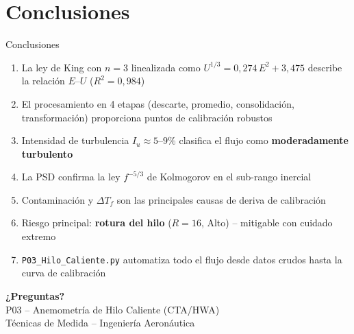 \documentclass[aspectratio=169,12pt]{beamer}
\begin{document}
\section{Conclusiones}

\begin{frame}{Conclusiones}
	\begin{enumerate}
		\item La ley de King con $n=3$ linealizada como
		      $U^{1/3} = 0{,}274\,E^2 + 3{,}475$ describe la
		      relación $E$--$U$ ($R^2 = 0{,}984$)
		\item El procesamiento en 4 etapas (descarte, promedio,
		      consolidación, transformación) proporciona puntos de
		      calibración robustos
		\item Intensidad de turbulencia $I_u \approx 5$--$9\%$
		      clasifica el flujo como \textbf{moderadamente turbulento}
		\item La PSD confirma la ley $f^{-5/3}$ de Kolmogorov en
		      el sub-rango inercial
		\item Contaminación y $\Delta T_f$ son las principales
		      causas de deriva de calibración
		\item Riesgo principal: \textbf{rotura del hilo}
		      ($R = 16$, Alto) -- mitigable con cuidado extremo
		\item \texttt{P03\_Hilo\_Caliente.py} automatiza todo el
		      flujo desde datos crudos hasta la curva de calibración
	\end{enumerate}

	\vspace{0.3em}
	\centering
\end{frame}

\begin{frame}{}
	\centering
	\vspace{2cm}
	{\Huge\color{aerogreen}\bfseries ¿Preguntas?}\\[1cm]
	{\large P03 -- Anemometría de Hilo Caliente (CTA/HWA)}\\[0.5cm]
	{\small Técnicas de Medida -- Ingeniería Aeronáutica}
\end{frame}
\end{document}
